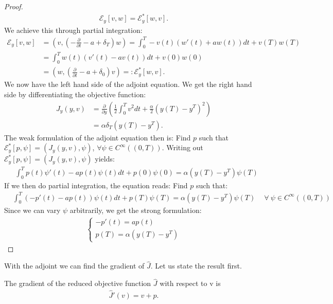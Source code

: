 \begin{proof}
\begin{align*}
\mathcal{E}_y[v,w]=\mathcal{E}_y^*[w,v].
\end{align*}
We achieve this through partial integration:
\begin{align*}
\mathcal{E}_y[v,w] &=(v,(-\frac{\partial}{\partial t} - a + \delta_T)w) = \int_0^T-v(t)(w'(t)+aw(t))dt + v(T)w(T) \\
&=\int_0^Tw(t)(v'(t)-a v(t))dt+v(0)w(0) \\
&= (w,(\frac{\partial}{\partial t} - a+\delta_0)v)
=:\mathcal{E}_y^*[w,v].
\end{align*}
We now have the left hand side of the adjoint equation. We get the right hand side by differentiating the objective function:
\begin{align*}
J_y(y,v) & = \frac{\partial}{\partial y} (\frac{1}{2}\int_0^Tv^2dt + \frac{\alpha}{2}(y(T)-y^T)^2) \\ 
&= \alpha\delta_T(y(T)-y^T).
\end{align*}
The weak formulation of the adjoint equation then is: Find $p$ such that $\mathcal{E}_y^*[p,\psi]=(J_y(y,v),\psi)$, $\forall\psi\in C^{\infty}((0,T))$. Writing out $\mathcal{E}_y^*[p,\psi]=(J_y(y,v),\psi)$ yields:
\begin{align*}
&\int_0^Tp(t)\psi'(t)-a p(t)\psi(t)dt + p(0)\psi(0)= \alpha(y(T)-y^T)\psi(T)
\end{align*}
If we then do partial integration, the equation reads: Find $p$ such that:
\begin{align*}
&\int_0^T(-p'(t)-ap(t))\psi(t)dt +p(T)\psi(T)= \alpha(y(T)-y^T)\psi(T)\ \quad\forall \ \psi \in C^{\infty}((0,T))
\end{align*}
Since we can vary $\psi$ arbitrarily, we get the strong formulation:
 \begin{align*}
   \left\{
     \begin{array}{lr}
       -p'(t) = ap(t) \\
       p(T) = \alpha( y(T)-y^T)
     \end{array}
   \right.
\end{align*}
\end{proof}
\noindent
With the adjoint we can find the gradient of $\hat{J}$. Let us state the result first.
\begin{proposition}
The gradient of the reduced objective function $\hat{J}$ with respect to v is
\begin{align}
\hat{J}'(v)=v+p. \label{exsample_grad}
\end{align} 
\end{proposition}

